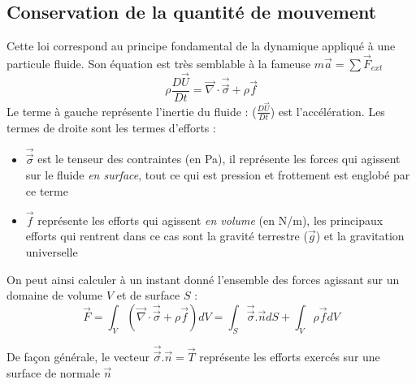 \subsection{Conservation de la quantité de mouvement}
Cette loi correspond au principe fondamental de la dynamique appliqué à une particule fluide. Son équation est très semblable à la fameuse $m\vec{a}=\sum \vec{F}_{ext}$
%
\begin{equation}
\rho \frac{D\vec{U}}{Dt} = \vec{\nabla} \cdot \vec{\vec{\sigma}} + \rho \vec{f}
\label{eq:QDM}
\end{equation}
%
Le terme à gauche représente l'inertie du fluide : ($\frac{D\vec{U}}{Dt}$) est l'accélération. Les termes de droite sont les termes d'efforts :

\begin{itemize}
\item $\vec{\vec{\sigma}}$ est le tenseur des contraintes (en Pa), il représente les forces qui agissent sur le fluide \textit{en surface}, tout ce qui est pression et frottement est englobé par ce terme

\item $\vec{f}$ représente les efforts qui agissent \textit{en volume} (en N/m), les principaux efforts qui rentrent dans ce cas sont la gravité terrestre ($\vec{g}$) et la gravitation universelle
\end{itemize}

On peut ainsi calculer à un instant donné l'ensemble des forces agissant sur un domaine de volume $V$ et de surface $S$ :
%
\begin{equation}
\vec{F} = \int_V { \left( \vec{\nabla} \cdot \vec{\vec{\sigma}} + \rho \vec{f} \right) dV }
        = \int_S { \vec{\vec{\sigma}}.\vec{n} dS} + \int_V {\rho \vec{f} dV }
\end{equation}

De façon générale, le vecteur $\vec{\vec{\sigma}}.\vec{n} = \vec{T}$ représente les efforts exercés sur une surface de normale $\vec{n}$


